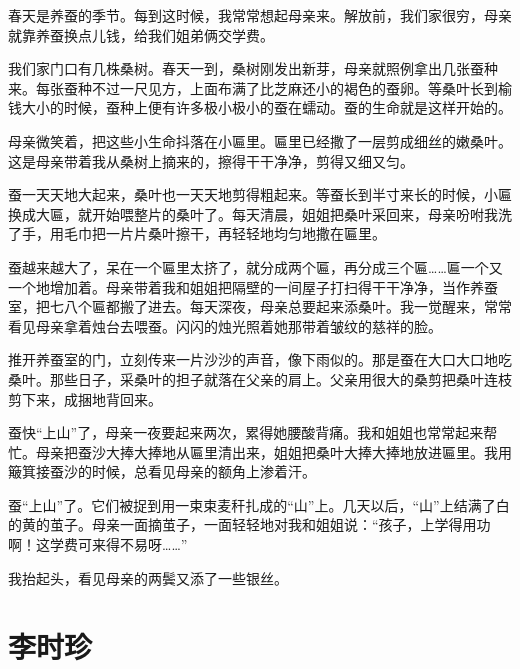 \documentclass[12pt,UTF-8,openany]{ctexbook}
\begin{document}
\begin{large}
    
    春天是养蚕的季节。每到这时候，我常常想起母亲来。解放前，我们家很穷，母亲就靠养蚕换点儿钱，给我们姐弟俩交学费。
    
    我们家门口有几株桑树。春天一到，桑树刚发出新芽，母亲就照例拿出几张蚕种来。每张蚕种不过一尺见方，上面布满了比芝麻还小的褐色的蚕卵。等桑叶长到榆钱大小的时候，蚕种上便有许多极小极小的蚕在蠕动。蚕的生命就是这样开始的。
    
    母亲微笑着，把这些小生命抖落在小匾里。匾里已经撒了一层剪成细丝的嫩桑叶。这是母亲带着我从桑树上摘来的，擦得干干净净，剪得又细又匀。
    
    蚕一天天地大起来，桑叶也一天天地剪得粗起来。等蚕长到半寸来长的时候，小匾换成大匾，就开始喂整片的桑叶了。每天清晨，姐姐把桑叶采回来，母亲吩咐我洗了手，用毛巾把一片片桑叶擦干，再轻轻地均匀地撒在匾里。
    
    蚕越来越大了，呆在一个匾里太挤了，就分成两个匾，再分成三个匾……匾一个又一个地增加着。母亲带着我和姐姐把隔壁的一间屋子打扫得干干净净，当作养蚕室，把七八个匾都搬了进去。每天深夜，母亲总要起来添桑叶。我一觉醒来，常常看见母亲拿着烛台去喂蚕。闪闪的烛光照着她那带着皱纹的慈祥的脸。
    
    推开养蚕室的门，立刻传来一片沙沙的声音，像下雨似的。那是蚕在大口大口地吃桑叶。那些日子，采桑叶的担子就落在父亲的肩上。父亲用很大的桑剪把桑叶连枝剪下来，成捆地背回来。
    
    蚕快“上山”了，母亲一夜要起来两次，累得她腰酸背痛。我和姐姐也常常起来帮忙。母亲把蚕沙大捧大捧地从匾里清出来，姐姐把桑叶大捧大捧地放进匾里。我用簸箕接蚕沙的时候，总看见母亲的额角上渗着汗。
    
    蚕“上山”了。它们被捉到用一束束麦秆扎成的“山”上。几天以后，“山”上结满了白的黄的茧子。母亲一面摘茧子，一面轻轻地对我和姐姐说：“孩子，上学得用功啊！这学费可来得不易呀……”
    
    我抬起头，看见母亲的两鬓又添了一些银丝。
    
\end{large}



\chapter{李时珍}
\end{document}
